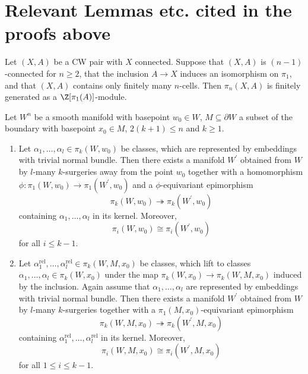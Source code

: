 \newpage

\section*{Relevant Lemmas etc. cited in the proofs above}

\begin{proposition}
    \label{appendix2:prop:finite_generation_lemma}
    Let $(X,A)$ be a CW pair with $X$ connected. Suppose that $(X,A)$ is $(n-1)$-connected for $n \geq 2$, that the inclusion $A \to X$ induces an isomorphism on $\pi_1$, and that $(X,A)$ contains only finitely many $n$-cells. Then $\pi_n(X,A)$ is finitely generated as a $\Z[\pi_1(A)]$-module.
\end{proposition}

\begin{proposition}
    \label{appendix:prop:surger_killer}
    Let $W^n$ be a smooth manifold with basepoint $w_0 \in W$, $M \subseteq \partial W$ a subset of the boundary with basepoint $x_0 \in M$, $2(k+1) \leq n$ and $k \geq 1$.
    \begin{enumerate}[label=(\roman*)]
        \item \label{appendix:eq:surgery_killer_absolute_version} Let $\alpha_1,\ldots,\alpha_l \in \pi_k(W,w_0)$ be classes, which are represented by embeddings with trivial normal bundle. Then there exists a manifold $W^\prime$ obtained from $W$ by $l$-many $k$-surgeries away from the point $w_0$ together with a homomorphism $\phi \colon \pi_1(W,w_0) \to \pi_1(W^\prime,w_0)$ and a $\phi$-equivariant epimorphism
        \[
        \pi_k(W,w_0) \twoheadrightarrow \pi_k(W^\prime,w_0)
        \]
        containing $\alpha_1,\ldots,\alpha_l$ in its kernel. Moreover, 
        \[
        \pi_i(W,w_0) \cong \pi_i(W^\prime,w_0)
        \] 
        for all $i \leq k-1$.
        \item \label{appendix:eq:surgery_killer_relative_version} Let $\alpha_1^\mathrm{rel},\ldots,\alpha_l^\mathrm{rel} \in \pi_k(W,M,x_0)$ be classes, which lift to classes $\alpha_1,\ldots,\alpha_l \in \pi_k(W,x_0)$ under the map $\pi_k(W,x_0) \to \pi_k(W,M,x_0)$ induced by the inclusion. Again assume that $\alpha_1,\ldots,\alpha_l$ are represented by embeddings with trivial normal bundle. Then there exists a manifold $W^\prime$ obtained from $W$ by $l$-many $k$-surgeries together with a $\pi_1(M,x_0)$-equivariant epimorphism
        \[
        \pi_k(W,M,x_0) \twoheadrightarrow \pi_k(W^\prime,M,x_0)
        \]
        containing $\alpha_1^\mathrm{rel},\ldots,\alpha_l^\mathrm{rel}$ in its kernel. Moreover, 
        \[
        \pi_i(W,M,x_0) \cong \pi_i(W^\prime,M,x_0)
        \] 
        for all $1 \leq i \leq k-1$.
    \end{enumerate}
\end{proposition}

